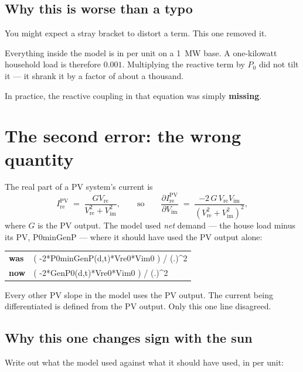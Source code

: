 \documentclass[11pt,a4paper]{article}
\newcommand{\code}[1]{{\ttfamily\small #1}}
\begin{document}
\subsection{Why this is worse than a typo}

You might expect a stray bracket to distort a term. This one removed it.

Everything inside the model is in per unit on a 1~MW base. A one-kilowatt household load
is therefore $0.001$. Multiplying the reactive term by $P_0$ did not tilt it --- it
shrank it by a factor of about a thousand.

In practice, the reactive coupling in that equation was simply \textbf{missing}.

\section{The second error: the wrong quantity}

The real part of a PV system's current is
\[
  I_{\mathrm{re}}^{\mathrm{PV}} \;=\; \frac{G V_{\mathrm{re}}}
                                            {V_{\mathrm{re}}^2 + V_{\mathrm{im}}^2},
  \qquad\text{so}\qquad
  \frac{\partial I_{\mathrm{re}}^{\mathrm{PV}}}{\partial V_{\mathrm{im}}}
  \;=\; \frac{-2\,G\,V_{\mathrm{re}} V_{\mathrm{im}}}
             {\left(V_{\mathrm{re}}^2 + V_{\mathrm{im}}^2\right)^2},
\]
where $G$ is the PV output. The model used \emph{net} demand --- the house load minus its
PV, \code{P0minGenP} --- where it should have used the PV output alone:

\begin{center}
\begin{tabular}{@{}ll@{}}
\toprule
\textbf{was} & \code{( -2*P0minGenP(d,t)*Vre0*Vim0 ) / (.)\^{}2} \\
\textbf{now} & \code{( -2*GenP0(d,t)*Vre0*Vim0 ) / (.)\^{}2} \\
\bottomrule
\end{tabular}
\end{center}

Every other PV slope in the model uses the PV output. The current being differentiated is
defined from the PV output. Only this one line disagreed.

\subsection{Why this one changes sign with the sun}

Write out what the model used against what it should have used, in per unit:
\end{document}
